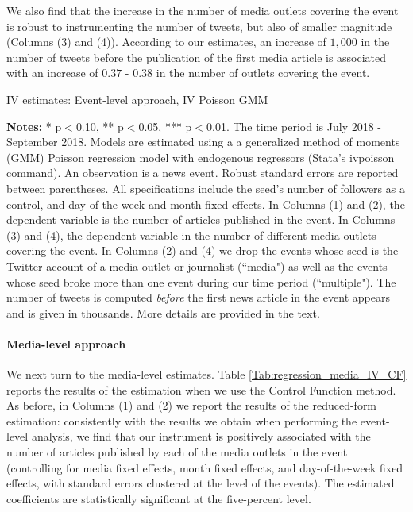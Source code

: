 We also find that the increase in the number of media outlets covering the event is robust to instrumenting the number of tweets, but also of smaller magnitude (Columns (3) and (4)). According to our estimates, an increase of $1,000$ in the number of tweets before the publication of the first media article is associated with an increase of $0.37$ - $0.38$ in the number of outlets covering the event.


\begin{table}
\caption{IV estimates: Event-level approach, IV Poisson GMM}
\begin{center}
	
\end{center}
\begin{spacing}{0.5}
	{\fns \textbf{Notes:} * p$<$0.10, ** p$<$0.05, *** p$<$0.01. The time period is July 2018 - September 2018. Models are estimated using a a generalized method of moments (GMM) Poisson regression model with endogenous regressors (Stata's ivpoisson command). An observation is a news event. Robust standard errors are reported between parentheses. All specifications include the seed's number of followers as a control, and day-of-the-week and month fixed effects. In Columns (1) and (2), the dependent variable is the number of articles published in the event. In Columns (3) and (4), the dependent variable in the number of different media outlets covering the event. In Columns (2) and (4) we drop the events whose seed is the Twitter account of a media outlet or journalist (``media") as well as the events whose seed broke more than one event during our time period (``multiple"). The number of tweets is computed \textit{before} the first news article in the event appears and is given in thousands. More details are provided in the text.}
\end{spacing}
\label{Tab:regression_event_IV_Poisson_GMM}
\end{table} 



\paragraph{Media-level approach}

We next turn to the media-level estimates. Table \ref{Tab:regression_media_IV_CF} reports the results of the estimation when we use the Control Function method. As before, in Columns (1) and (2) we report the results of the reduced-form estimation: consistently with the results we obtain when performing the event-level analysis, we find that our instrument is positively associated with the number of articles published by each of the media outlets in the event (controlling for media fixed effects, month fixed effects, and day-of-the-week fixed effects, with standard errors clustered at the level of the events). The estimated coefficients are statistically significant at the five-percent level.

